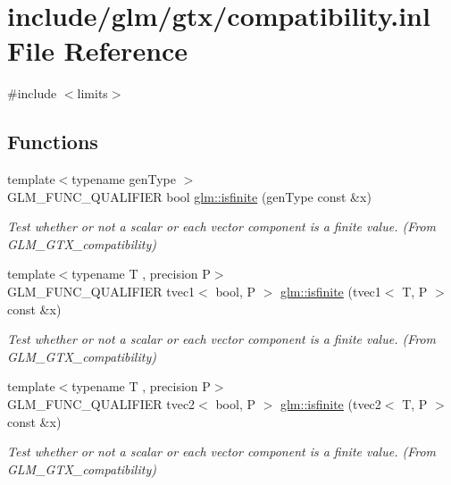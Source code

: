 \hypertarget{compatibility_8inl}{}\section{include/glm/gtx/compatibility.inl File Reference}
\label{compatibility_8inl}
{\ttfamily \#include $<$limits$>$}\newline
\subsection*{Functions}
\begin{DoxyCompactItemize}
\item 
{\footnotesize template$<$typename gen\+Type $>$ }\\G\+L\+M\+\_\+\+F\+U\+N\+C\+\_\+\+Q\+U\+A\+L\+I\+F\+I\+ER bool \hyperlink{group__gtx__compatibility_gaf4b04dcd3526996d68c1bfe17bfc8657}{glm\+::isfinite} (gen\+Type const \&x)
\begin{DoxyCompactList}\small\item\em Test whether or not a scalar or each vector component is a finite value. (From G\+L\+M\+\_\+\+G\+T\+X\+\_\+compatibility) \end{DoxyCompactList}\item 
{\footnotesize template$<$typename T , precision P$>$ }\\G\+L\+M\+\_\+\+F\+U\+N\+C\+\_\+\+Q\+U\+A\+L\+I\+F\+I\+ER tvec1$<$ bool, P $>$ \hyperlink{group__gtx__compatibility_ga553e2e95b06a0f70c718605998889d3b}{glm\+::isfinite} (tvec1$<$ T, P $>$ const \&x)
\begin{DoxyCompactList}\small\item\em Test whether or not a scalar or each vector component is a finite value. (From G\+L\+M\+\_\+\+G\+T\+X\+\_\+compatibility) \end{DoxyCompactList}\item 
{\footnotesize template$<$typename T , precision P$>$ }\\G\+L\+M\+\_\+\+F\+U\+N\+C\+\_\+\+Q\+U\+A\+L\+I\+F\+I\+ER tvec2$<$ bool, P $>$ \hyperlink{group__gtx__compatibility_ga7dd492aa7d6ec21715f9a91b6e5e596a}{glm\+::isfinite} (tvec2$<$ T, P $>$ const \&x)
\begin{DoxyCompactList}\small\item\em Test whether or not a scalar or each vector component is a finite value. (From G\+L\+M\+\_\+\+G\+T\+X\+\_\+compatibility) \end{DoxyCompactList}\item 

\end{DoxyCompactItemize}
